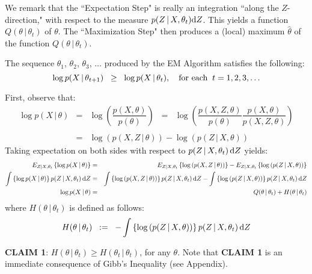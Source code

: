 \begin{remark}\quad
We remark that the ``Expectation Step" is really an integration ``along the $Z$-direction,"
with respect to the measure $p(Z\,|\,X,\theta_{t})\textnormal{d}Z$.
This yields a function $Q(\theta\,|\,\theta_{t})$ of $\theta$.
The ``Maximization Step" then produces a (local) maximum $\widehat{\theta}$ of the function
$Q(\theta\,|\,\theta_{t})$.
\end{remark}
\begin{theorem}\quad
The sequence $\theta_{1}$, $\theta_{2}$, $\theta_{3}$, $\ldots$ produced by the EM Algorithm
satisfies the following:
\begin{equation*}
\log p(X\,|\,\theta_{t+1}) \;\; \geq \;\; \log p(X\,|\,\theta_{t}),
\quad
\textnormal{for each}\;\;t = 1, 2, 3, \ldots
\end{equation*}
\end{theorem}
\proof First, observe that:
\begin{eqnarray*}
\log p(X\,|\,\theta)
& = & \log\left(\dfrac{p(X,\theta)}{p(\theta)}\right)
\;\; = \;\; \log\left(\dfrac{p(X,Z,\theta)}{p(\theta)}\dfrac{p(X,\theta)}{p(X,Z,\theta)}\right) \\
&& \\
& = & \log\left(p(X,Z\,|\,\theta)\right) - \log\left(p(Z\,|\,X,\theta)\right)
\end{eqnarray*}
Taking expectation on both sides with respect to $p(Z\,|\,X,\theta_{t})\,\textnormal{d}Z$ yields:
\begin{eqnarray*}
E_{Z|X,\theta_{t}}\left\{\log p(X\,|\,\theta)\right\}
& = &
E_{Z|X,\theta_{t}}\left\{\log\left(p(X,Z\,|\,\theta)\right)\right\}
-
E_{Z|X,\theta_{t}}\left\{\log\left(p(Z\,|\,X,\theta)\right)\right\}
\\
\int\left\{\log p(X\,|\,\theta)\right\}p(Z\,|\,X,\theta_{t})\,\textnormal{d}Z
& = &
\int\left\{\log\left(p(X,Z\,|\,\theta)\right)\right\}p(Z\,|\,X,\theta_{t})\,\textnormal{d}Z
-
\int\left\{\log\left(p(Z\,|\,X,\theta)\right)\right\}p(Z\,|\,X,\theta_{t})\,\textnormal{d}Z
\\
\log p(X\,|\,\theta)
& = &
Q(\theta\,|\,\theta_{t}) + H(\theta\,|\,\theta_{t})
\end{eqnarray*}
where $H(\theta\,|\,\theta_{t})$ is defined as follows:
\begin{equation*}
H(\theta\,|\,\theta_{t})
\;\; := \;\;
- \int\left\{\log\left(p(Z\,|\,X,\theta)\right)\right\}p(Z\,|\,X,\theta_{t})\,\textnormal{d}Z
\end{equation*}

\vskip 0.5cm
\noindent
\textbf{CLAIM 1}:\;\; $H(\theta\,|\,\theta_{t}) \geq H(\theta_{t}\,|\,\theta_{t})$,\;\; for any $\theta$.
\vskip 0.1cm
\noindent
Note that \textbf{CLAIM 1} is an immediate consequence of Gibb's Inequality (see Appendix).

